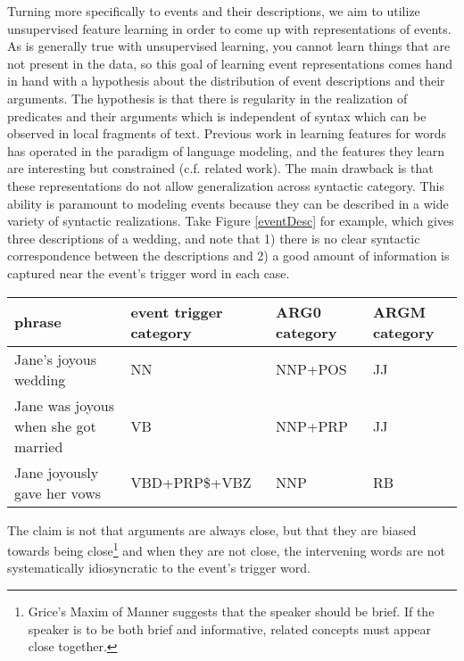 \documentclass[11pt,letterpaper]{article}
\begin{document}
Turning more specifically to events and their descriptions,
we aim to utilize unsupervised feature learning in order to
come up with representations of events.
As is generally true with unsupervised learning, you cannot learn
things that are not present in the data, so this goal of learning event
representations comes hand in hand with a hypothesis about the
distribution of event descriptions and their arguments.
The hypothesis is that there is regularity in the realization of predicates
and their arguments which is independent of syntax which can be observed
in local fragments of text.
Previous work in learning features for words has operated in the
paradigm of language modeling, and the features they learn are
interesting but constrained (c.f. related work).
The main drawback is that these representations do not allow generalization
across syntactic category.
This ability is paramount to modeling events because they can be described
in a wide variety of syntactic realizations.
Take Figure \ref{eventDesc} for example, which gives three descriptions of a wedding,
and note that
1) there is no clear syntactic correspondence between the descriptions
and 2) a good amount of information is captured near the event's trigger word in each case.

% 
\begin{figure*}[ht]
\begin{tabular}{ | l | l | l | l | }
\hline
phrase & event trigger category & ARG0 category & ARGM category \\
\hline
Jane's joyous wedding & NN & NNP+POS & JJ \\
Jane was joyous when she got married & VB & NNP+PRP & JJ \\
Jane joyously gave her vows & VBD+PRP\$+VBZ & NNP & RB \\
\hline
\end{tabular}
\caption{three syntactically disparate descriptions of the same event}
\label{eventDesc}
\end{figure*}


The claim is not that arguments are always close, but
that they are biased towards being close\footnote{Grice's Maxim of Manner suggests
that the speaker should be brief. If the speaker is to be both brief and informative,
related concepts must appear close together.}
and when they are not close, the intervening words are not
systematically idiosyncratic to the event's trigger word.
\end{document}
